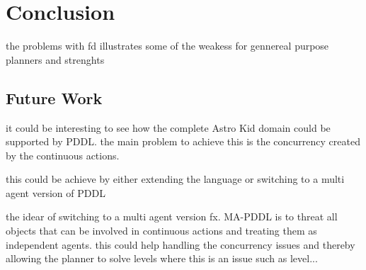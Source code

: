 \section{Conclusion}

the problems with fd illustrates some of the weakess for gennereal purpose planners and strenghts



\subsection{Future Work}

	it could be interesting to see how the complete Astro Kid domain could be supported by PDDL. the main problem to achieve this is the concurrency created by the continuous actions.
	
	
	this could be achieve by either extending the language or switching to a multi agent version of PDDL

	
	the idear of switching to a multi agent version fx. MA-PDDL is to threat all objects that can be involved in continuous actions and treating them as independent agents. this could help handling the concurrency issues and thereby allowing the planner to solve levels where this is an issue such as level... 
	
	
	